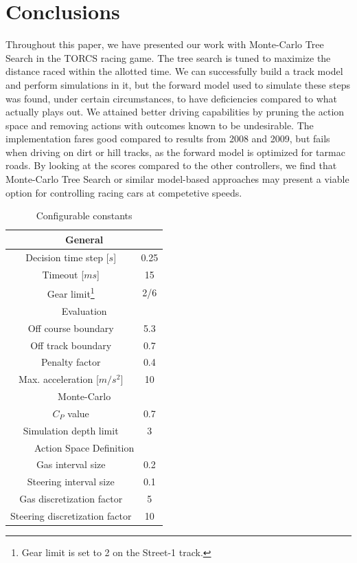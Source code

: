 \documentclass[conference]{IEEEtran}
\begin{document}
\section{Conclusions}
\label{sec-conclusion}
Throughout this paper, we have presented our work with Monte-Carlo Tree Search in the TORCS racing game. The tree search is tuned to maximize the distance raced within the allotted time. We can successfully build a track model and perform simulations in it, but the forward model used to simulate these steps was found, under certain circumstances, to have deficiencies compared to what actually plays out. We attained better driving capabilities by pruning the action space and removing actions with outcomes known to be undesirable. The implementation fares good compared to results from 2008 and 2009, but fails when driving on dirt or hill tracks, as the forward model is optimized for tarmac roads. By looking at the scores compared to the other controllers, we find that Monte-Carlo Tree Search or similar model-based approaches may present a viable option for controlling racing cars at competetive speeds.

\begin{savenotes}
\begin{table}
\begin{center}
\renewcommand{\arraystretch}{1.3}
\caption{Configurable constants}
\label{tab-config}
\begin{tabular}{|c|c|} \hline
\multicolumn{2}{c}{General} \\ \hline
Decision time step [$s$] & 0.25 \\ \hline
Timeout [$ms$] & 15 \\ \hline
Gear limit\footnote{Gear limit is set to 2 on the Street-1 track.} & 2/6 \\ \hline
\multicolumn{2}{c}{Evaluation} \\ \hline
Off course boundary & 5.3 \\ \hline
Off track boundary & 0.7 \\ \hline
Penalty factor & 0.4 \\ \hline
Max. acceleration [$m/s^2$] & 10 \\ \hline
\multicolumn{2}{c}{Monte-Carlo} \\ \hline
$C_P$ value & 0.7 \\ \hline
Simulation depth limit & 3 \\ \hline
\multicolumn{2}{c}{Action Space Definition} \\ \hline
Gas interval size & 0.2 \\ \hline
Steering interval size & 0.1 \\ \hline
Gas discretization factor & 5 \\ \hline
Steering discretization factor & 10 \\ \hline
\end{tabular}
\end{center}
\end{table}
\end{savenotes}
\end{document}
